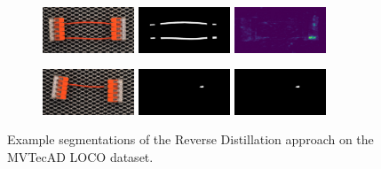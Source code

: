 \begin{figure}[H]
    \begin{subfigure}[b]{\textwidth}
        \centering
        \begin{minipage}{0.45\textwidth}
            \centering
            \includegraphics[width=0.3\textwidth]{figures/appendix/appendix_DRAEM/SC/175.png}
            \includegraphics[width=0.3\textwidth]{figures/appendix/appendix_DRAEM/SC/175m.png}
            \includegraphics[width=0.3\textwidth]{figures/appendix/appendix_DRAEM/SC/175_mask.png}
        \end{minipage}
        \begin{minipage}{0.45\textwidth}
            \centering
            \includegraphics[width=0.3\textwidth]{figures/appendix/appendix_DRAEM/SC/237.png}
            \includegraphics[width=0.3\textwidth]{figures/appendix/appendix_DRAEM/SC/237m.png}
            \includegraphics[width=0.3\textwidth]{figures/appendix/appendix_DRAEM/SC/237m.png}
        \end{minipage}
    \end{subfigure}


    \caption{Example segmentations of the Reverse Distillation \cite{revdist2023} approach on the MVTecAD LOCO \cite{LOCODentsAndScratchesBergmann2022} dataset.}
    \label{fig:appendixDRAEM}
\end{figure}